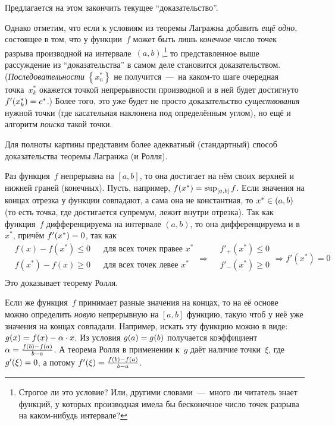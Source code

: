 \documentclass[a4paper,12pt]{article}
\begin{document}
  Предлагается на этом закончить текущее ``доказательство''.

  Однако отметим, что если к условиям из теоремы Лагражна добавить \emph{ещё одно}, состоящее в том, что у функции~$f$ может быть лишь \emph{конечное} число точек разрыва производной на интервале~$(a, b)$,\footnote{
    Строгое ли это условие?
    Или, другими словами~---~много ли читатель знает функций, у которых производная имела бы бесконечное число точек разрыва на каком-нибудь интервале?
  } то представленное выше рассуждение из ``доказательства'' в самом деле становится доказательством.
  (\emph{Последовательности} $\left\{x^*_n\right\}$ не получится~---~на каком-то шаге очередная точка~$x^*_k$ окажется точкой непрерывности производной и в ней будет достигнуто $f'(x^*_k) \hm= c^*$.)
  Более того, это уже будет не просто доказательство \emph{существования} нужной точки (где касательная наклонена под определённым углом), но ещё и алгоритм \emph{поиска} такой точки.


  \begin{remark}
    Для полноты картины представим более адекватный (стандартный) способ доказательства теоремы Лагранжа (и Ролля).

    Раз функция~$f$ непрерывна на $[a, b]$, то она достигает на нём своих верхней и нижней граней (конечных).
    Пусть, например, $f(x^*) \hm= \sup_{[a, b]} f$.
    Если значения на концах отрезка у функции совпадают, а сама она не константная, то $x^* \hm\in (a, b)$ (то есть точка, где достигается супремум, лежит внутри отрезка).
    Так как функция~$f$ дифференцируема на интервале $(a, b)$, то она дифференцируема и в $x^*$, причём $f'(x^*) \hm= 0$, так как
    \[
      \begin{aligned}
        &f(x) - f(x^*) \leq 0 & &\mbox{для всех точек правее } x^*\\
        &f(x^*) - f(x) \geq 0 & &\mbox{для всех точек левее } x^*\\
      \end{aligned}
      \Rightarrow
      \begin{aligned}
        &f'_+(x^*) \leq 0\\
        &f'_-(x^*) \geq 0\\
      \end{aligned}
      \Rightarrow
      f'(x^*) = 0
    \]
    Это доказывает теорему Ролля.

    Если же функция~$f$ принимает разные значения на концах, то на её основе можно определить \emph{новую} непрерывную на $[a, b]$ функцию, такую чтоб у неё уже значения на концах совпадали.
    Например, искать эту функцию можно в виде: $g(x) \hm= f(x) - \alpha \hm\cdot x$.
    Из условия $g(a) \hm= g(b)$ получается коэффициент $\alpha \hm= \frac{f(b) - f(a)}{b - a}$.
    А теорема Ролля в применении к~$g$ даёт наличие точки~$\xi$, где $g'(\xi) \hm= 0$, а потому $f'(\xi) \hm= \frac{f(b) - f(a)}{b - a}$.
  \end{remark}
\end{document}
